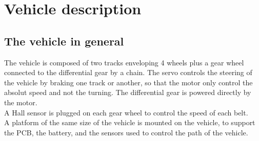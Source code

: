 \section{Vehicle description}

\subsection{The vehicle in general}

The vehicle is composed of two tracks enveloping 4 wheels plus a gear wheel connected to the differential gear by a chain. The servo controls the steering of the vehicle by braking one track or another, so that the motor only control the absolut speed and not the turning. The differential gear is powered directly by the motor.\\
A Hall sensor is plugged on each gear wheel to control the speed of each belt.\\
A platform of the same size of the vehicle is mounted on the vehicle, to support the PCB, the battery, and the sensors used to control the path of the vehicle.\\

